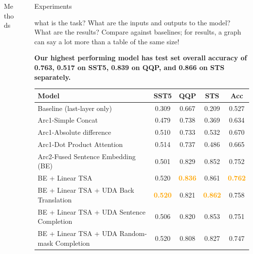 \documentclass[final]{beamer}
\newlength{\sepwidth}
\newlength{\colwidth}
\newcommand{\separatorcolumn}{\begin{column}{\sepwidth}\end{column}}
\begin{document}
\begin{frame}[t]
\begin{columns}[t]
\begin{column}{\colwidth}
\begin{block}{Methods}
  \end{block}


\end{column}

\separatorcolumn

\begin{column}{\colwidth}



  \begin{block}{Experiments}

        what is the task? What are the inputs and outputs to the model? What are the results? Compare against baselines; for results, a graph can say a lot more than a table of the same size!
  

    \textbf{Our highest performing model has test set overall accuracy of 0.763, 
    0.517 on SST5, 0.839 on QQP, and 0.866 on STS separately.}



    {\large
    \begin{table}[H]
      \centering
      \label{tab:baseline_ext}
      \begin{tabular}{@{}lcccc@{}}
        \toprule
        \textbf{Model} & \multicolumn{1}{c}{\textbf{SST5}} & \multicolumn{1}{c}{\textbf{QQP}} & \multicolumn{1}{c}{\textbf{STS}} & \multicolumn{1}{c}{\textbf{Acc}} \\ \midrule
        Baseline (last-layer only) & 0.309 & 0.667 & 0.209 & 0.527 \\
        Arc1-Simple Concat & 0.479 & 0.738 & 0.369 & 0.634 \\
        Arc1-Absolute difference & 0.510 & 0.733 & 0.532 & 0.670 \\
        Arc1-Dot Product Attention & 0.514 & 0.737 & 0.486 & 0.665 \\
        Arc2-Fused Sentence Embedding (BE) & 0.501 & 0.829 & 0.852 & 0.752 \\
        BE + Linear TSA & 0.520 & \textcolor{orange}{\textbf{0.836}} & 0.861 & \textcolor{orange}{\textbf{0.762}} \\
        BE + Linear TSA + UDA Back Translation & \textcolor{orange}{\textbf{0.520}} & 0.821 & \textcolor{orange}{\textbf{0.862}} & 0.758 \\
        BE + Linear TSA + UDA Sentence Completion & 0.506 & 0.820 & 0.853 & 0.751 \\
        BE + Linear TSA + UDA Random-mask Completion & 0.520 & 0.808 & 0.827 & 0.747 \\ 
        \bottomrule
      \end{tabular}
    \end{table}
    }
    



\end{block}
\end{column}
\end{columns}
\end{frame}
\end{document}
